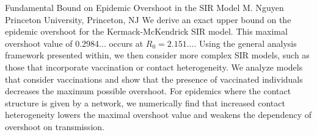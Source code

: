 
    \begin{abstract_online}{Fundamental Bound on Epidemic Overshoot in the SIR Model}{%
        M. Nguyen}{%
        }{%
        Princeton University, Princeton, NJ}
    We derive an exact upper bound on the epidemic overshoot for the Kermack-McKendrick SIR model. This maximal overshoot value of 0.2984... occurs at $R_0 = 2.151\dots$. Using the general analysis framework presented within, we then consider more complex SIR models, such as those that incorporate vaccination or contact heterogeneity. We analyze models that consider vaccinations and show that the presence of vaccinated individuals decreases the maximum possible overshoot. For epidemics where the contact structure is given by a network, we numerically find that increased contact heterogeneity lowers the maximal overshoot value and weakens the dependency of overshoot on transmission. 
    
    \end{abstract_online}
    